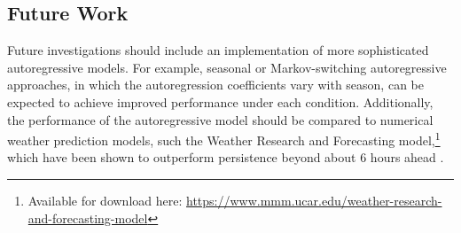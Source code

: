 \documentclass[11pt, oneside]{article}
\begin{document}
\subsection{Future Work}
Future investigations should include an implementation of more sophisticated autoregressive models.
For example, seasonal \citep[Sec.~3.1.6]{Chatfield2000} or Markov-switching \citep{AilliotMonbet2012} autoregressive approaches, in which the autoregression coefficients vary with season, can be expected to achieve improved performance under each condition.
Additionally, the performance of the autoregressive model should be compared to numerical weather prediction models, such the Weather Research and Forecasting model,\footnote{Available for download here: \url{https://www.mmm.ucar.edu/weather-research-and-forecasting-model}} which have been shown to outperform persistence beyond about 6 hours ahead \citep{Giebel2011,LandbergWatson1994}.



\end{document}
